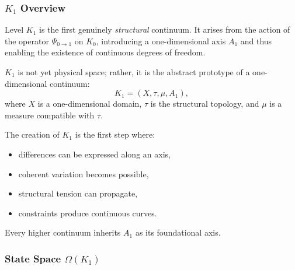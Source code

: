 

\subsubsection{\texorpdfstring{$K_1$}{K_1} Overview}
\label{sec:k1-overview}

Level $K_1$ is the first genuinely \emph{structural} continuum.
It arises from the action of the operator $\Psi_{0\to1}$ on $K_0$,
introducing a one-dimensional axis $A_1$ and thus enabling the existence
of continuous degrees of freedom.

$K_1$ is not yet physical space; rather, it is the abstract prototype of
a one-dimensional continuum:
\[
K_1 = (X, \tau, \mu, A_1),
\]
where $X$ is a one-dimensional domain, $\tau$ is the structural
topology, and $\mu$ is a measure compatible with $\tau$.

The creation of $K_1$ is the first step where:
\begin{itemize}
    \item differences can be expressed along an axis,
    \item coherent variation becomes possible,
    \item structural tension can propagate,
    \item constraints produce continuous curves.
\end{itemize}

Every higher continuum inherits $A_1$ as its foundational axis.

\subsubsection{State Space \texorpdfstring{$\Omega(K_1)$}{\Omega(K_1)}}

